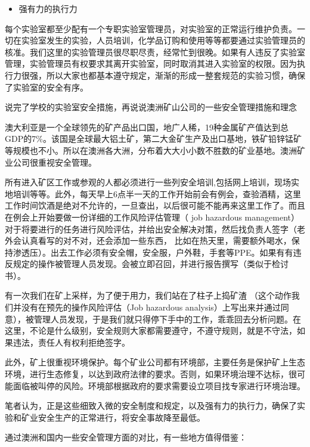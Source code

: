 \documentclass[
]{book}
\providecommand{\tightlist}{%
  \setlength{\itemsep}{0pt}\setlength{\parskip}{0pt}}
\begin{document}
\begin{itemize}
\tightlist
\item
  强有力的执行力
\end{itemize}

每个实验室都至少配有一个专职实验室管理员，对实验室的正常运行维护负责。一切在实验室发生的实验，人员培训，化学品订购和使用等等都要通过实验管理员的核准。我们这里的实验管理员很尽职尽责，经常忙到很晚。如果有人违反了实验室管理，实验管理员有权要求其离开实验室，同时取消其进入实验室的权限。因为执行力很强，所以大家也都基本遵守规定，渐渐的形成一整套规范的实验习惯，确保了实验室的安全有序。

说完了学校的实验室安全措施，再说说澳洲矿山公司的一些安全管理措施和理念

澳大利亚是一个全球领先的矿产品出口国，地广人稀，19种金属矿产值达到总GDP的7\%。该国是全球最大铝土矿，第二大金矿生产及出口基地，铁矿铅锌锰矿等规模也不小。所以在澳洲各大洲，分布着大大小小数不胜数的矿业基地。澳洲矿业公司很重视安全管理。

所有进入矿区工作或参观的人都必须进行一些列安全培训,包括网上培训，现场实地培训等等。此外，每天早上6点半一天的工作开始前会有例会，查验酒精，这里工作时间饮酒是绝对不允许的，一旦查出，以后很可能不能再来这里工作了。而且在例会上开始要做一份详细的工作风险评估管理（ job hazardous management）对于将要进行的任务进行风险评估，并给出安全解决对策，然后找负责人签字（老外会认真看写的对不对，还会添加一些东西， 比如在热天里，需要额外喝水，保持渗透压）。出去工作必须有安全帽，安全服，户外鞋，手套等PPE。如果有有违反规定的操作被管理人员发现。会被立即召回，并进行报告撰写（类似于检讨书）。

有一次我们在矿上采样，为了便于用力，我们站在了柱子上捣矿渣 （这个动作我们并没有在预先的操作风险评估（Job hazardous analysis）上写出来并通过同意），被管理人员发现，于是我们就只得停下手中的工作，乖乖回去分析问题。在这里，不论是什么级别，安全规则大家都需要遵守，不遵守规则，就是不守法，如果违法，责任人有权利拒绝签字。

此外，矿上很重视环境保护。每个矿业公司都有环境部，主要任务是保护矿上生态环境，进行生态修复，以达到政府法律的要求。否则，如果环境治理不达标，很可能面临被叫停的风险。环境部根据政府的要求需要设立项目找专家进行环境治理。

笔者认为，正是这些细致入微的安全制度和规定，以及强有力的执行力，确保了实验和矿业安全生产的正常进行，将安全事故降至最低。

通过澳洲和国内一些安全管理方面的对比，有一些地方值得借鉴：
\end{document}
